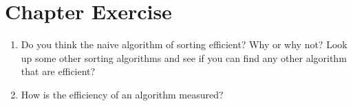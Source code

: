 \documentclass[../main.tex]{subfiles}
\begin{document}
    \section{Chapter Exercise}
    \begin{enumerate}
        \item Do you think the naive algorithm of sorting efficient? Why or why
        not? Look up some other sorting algorithms and see if you can find
        any other algorithm that are efficient?
        \item How is the efficiency of an algorithm measured?
    \end{enumerate}
\end{document}
